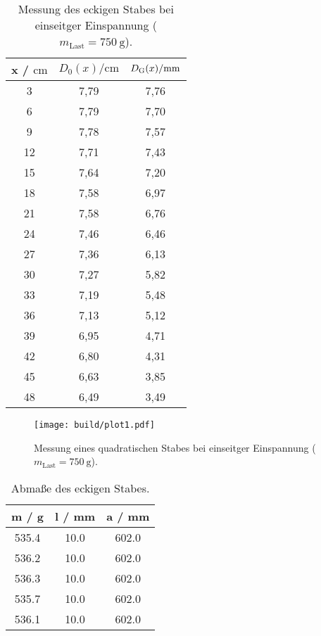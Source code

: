 \sloppy
\begin{table}[H]
  \centering
  \caption{Messung des eckigen Stabes bei einseitger Einspannung ($ m_{\text{Last}} = \SI{750}{\gram}$).}
  \label{tab:werte1}
  \begin{tabular}{c c c}
    \toprule
    x / $\si{\centi\meter} $ & $ D_0(x) / \si{\centi\meter}$ & $D_{\text G}(x) / \si{\milli\meter}$ \\
    \midrule
    3 & 7,79 & 7,76 \\
    6 & 7,79 & 7,70 \\
    9 & 7,78 & 7,57 \\
    12 & 7,71 & 7,43 \\
    15 & 7,64 & 7,20 \\
    18 & 7,58 & 6,97 \\
    21 & 7,58 & 6,76 \\
    24 & 7,46 & 6,46 \\
    27 & 7,36 & 6,13 \\
    30 & 7,27 & 5,82 \\
    33 & 7,19 & 5,48 \\
    36 & 7,13 & 5,12 \\
    39 & 6,95 & 4,71 \\
    42 & 6,80 & 4,31 \\
    45 & 6,63 & 3,85 \\
    48 & 6,49 & 3,49 \\
    \bottomrule
  \end{tabular}
\end{table}

\sloppy
\begin{figure}
  \centering
  \texttt{[image: build/plot1.pdf]}
  \caption{Messung eines quadratischen Stabes bei einseitger Einspannung ($m_{\text{Last}} = \SI{750}{\gram}$).}
  \label{fig:plot1}
\end{figure}

\sloppy
\begin{table}[H]
  \centering
  \caption{Abmaße des eckigen Stabes.}
  \label{tab:eckigStab}
  \begin{tabular}{c c c}
    \toprule
    m / g & l / mm & a / mm \\
    \midrule
    535.4 & 10.0 & 602.0 \\
    536.2 & 10.0 & 602.0 \\
    536.3 & 10.0 & 602.0 \\
    535.7 & 10.0 & 602.0 \\
    536.1 & 10.0 & 602.0 \\
    \bottomrule
  \end{tabular}
\end{table}

